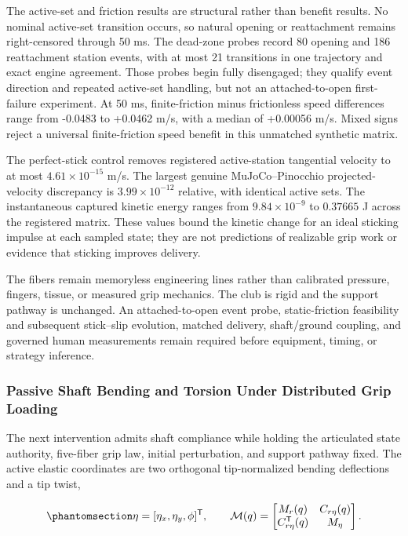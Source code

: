 \documentclass[
  letterpaper,
]{report}
\begin{document}
The active-set and friction results are structural rather than benefit
results. No nominal active-set transition occurs, so natural opening or
reattachment remains right-censored through 50 ms. The dead-zone probes
record 80 opening and 186 reattachment station events, with at most 21
transitions in one trajectory and exact engine agreement. Those probes
begin fully disengaged; they qualify event direction and repeated
active-set handling, but not an attached-to-open first-failure
experiment. At 50 ms, finite-friction minus frictionless speed
differences range from -0.0483 to +0.0462 m/s, with a median of +0.00056
m/s. Mixed signs reject a universal finite-friction speed benefit in
this unmatched synthetic matrix.

The perfect-stick control removes registered active-station tangential
velocity to at most \(4.61\times10^{-15}\) m/s. The largest genuine
MuJoCo--Pinocchio projected-velocity discrepancy is
\(3.99\times10^{-12}\) relative, with identical active sets. The
instantaneous captured kinetic energy ranges from \(9.84\times10^{-9}\)
to \(0.37665\) J across the registered matrix. These values bound the
kinetic change for an ideal sticking impulse at each sampled state; they
are not predictions of realizable grip work or evidence that sticking
improves delivery.

The fibers remain memoryless engineering lines rather than calibrated
pressure, fingers, tissue, or measured grip mechanics. The club is rigid
and the support pathway is unchanged. An attached-to-open event probe,
static-friction feasibility and subsequent stick--slip evolution,
matched delivery, shaft/ground coupling, and governed human measurements
remain required before equipment, timing, or strategy inference.

\subsubsection{Passive Shaft Bending and Torsion Under Distributed Grip
Loading}\label{passive-shaft-bending-and-torsion-under-distributed-grip-loading}

The next intervention admits shaft compliance while holding the
articulated state authority, five-fiber grip law, initial perturbation,
and support pathway fixed. The active elastic coordinates are two
orthogonal tip-normalized bending deflections and a tip twist,

\begin{equation}\phantomsection\label{eq-articulated-shaft-mass}{
\eta = [\eta_x,\eta_y,\phi]^\mathsf{T}, \qquad
\mathcal{M}(q)=
\begin{bmatrix}
M_r(q) & C_{r\eta}(q)\\
C_{r\eta}^{\mathsf{T}}(q) & M_\eta
\end{bmatrix}.
}\end{equation}
\end{document}
